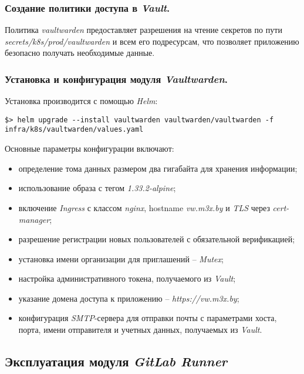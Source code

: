 \subsubsection{Создание политики доступа в \textit{Vault}.} Политика \textit{vaultwarden} предоставляет разрешения на чтение секретов по пути \textit{secrets/k8s/prod/vaultwarden} и всем его подресурсам, что позволяет приложению безопасно получать необходимые данные.

\subsubsection{Установка и конфигурация модуля \textit{Vaultwarden}.} Установка производится с помощью \textit{Helm}:

\begin{lstlisting}
$> helm upgrade --install vaultwarden vaultwarden/vaultwarden -f infra/k8s/vaultwarden/values.yaml
\end{lstlisting}

Основные параметры конфигурации включают:

\begin{itemize}
    \item определение тома данных размером два гигабайта для хранения информации;
    \item использование образа с тегом \textit{1.33.2-alpine};
    \item включение \textit{Ingress} с классом \textit{nginx}, hostname \textit{vw.m3x.by} и \textit{TLS} через \textit{cert-manager};
    \item разрешение регистрации новых пользователей с обязательной верификацией;
    \item установка имени организации для приглашений -- \textit{Mutex};
    \item настройка административного токена, получаемого из \textit{Vault};
    \item указание домена доступа к приложению -- \textit{https://vw.m3x.by};
    \item конфигурация \textit{SMTP}-сервера для отправки почты с параметрами хоста, порта, имени отправителя и учетных данных, получаемых из \textit{Vault}.
\end{itemize}



\subsection{Эксплуатация модуля \textit{GitLab Runner}}


